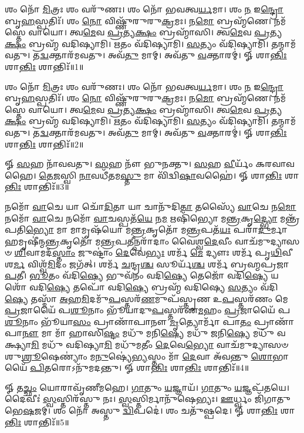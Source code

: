 


𑌶𑌂 𑌨𑍋᳴ \ul{𑌮𑌿}\-𑌤𑍍𑌰𑌃 𑌶𑌂 𑌵𑌰𑍁᳴𑌣𑌃। 
𑌶𑌂 𑌨𑍋᳴ 𑌭𑌵𑌤𑍍𑌵\-\ul{𑌰𑍍𑌯}\-𑌮𑌾। 
𑌶𑌂 \ul{𑌨} 𑌇\-\ul{𑌨𑍍𑌦𑍍𑌰𑍋} 𑌬𑍃\-\ul{𑌹}\-𑌸𑍍𑌪𑌤𑌿𑌃᳴। 
𑌶𑌂 \ul{𑌨𑍋} 𑌵𑌿𑌷𑍍𑌣𑍁᳴𑌰𑍁𑌰𑍁\-\ul{𑌕𑍍𑌰}\-𑌮𑌃। 
𑌨\-\ul{𑌮𑍋} 𑌬𑍍𑌰𑌹𑍍𑌮᳴𑌣𑍇। 
𑌨𑌮᳴𑌸𑍍𑌤𑍇 𑌵𑌾𑌯𑍋। 
𑌤𑍍𑌵\-\ul{𑌮𑍇}\-𑌵 \ul{𑌪𑍍𑌰}\-𑌤𑍍𑌯\-\ul{𑌕𑍍𑌷𑌂} 𑌬𑍍𑌰𑌹𑍍𑌮𑌾᳴𑌸𑌿। 
𑌤𑍍𑌵\-\ul{𑌮𑍇}\-𑌵 \ul{𑌪𑍍𑌰}\-𑌤𑍍𑌯\-\ul{𑌕𑍍𑌷𑌂} 𑌬𑍍𑌰𑌹𑍍𑌮᳴ 𑌵𑌦𑌿𑌷𑍍𑌯𑌾𑌮𑌿। 
\-\ul{𑌋}\-𑌤𑌂 𑌵᳴𑌦𑌿𑌷𑍍𑌯𑌾𑌮𑌿। 
\-\ul{𑌸}\-𑌤𑍍𑌯𑌂 𑌵᳴𑌦𑌿𑌷𑍍𑌯𑌾𑌮𑌿। 
𑌤𑌨𑍍𑌮𑌾𑌮᳴𑌵𑌤𑍁। 
𑌤\-\ul{𑌦𑍍𑌵}\-𑌕𑍍𑌤𑌾𑌰᳴𑌮𑌵𑌤𑍁। 
𑌅𑌵᳴\-\ul{𑌤𑍁} 𑌮𑌾𑌮𑍍। 
𑌅𑌵᳴𑌤𑍁 \ul{𑌵}\-𑌕𑍍𑌤𑌾𑌰𑌮𑍍॑। 
𑍐 𑌶𑌾\-\ul{𑌨𑍍𑌤𑌿𑌃} 𑌶𑌾\-\ul{𑌨𑍍𑌤𑌿𑌃} 𑌶𑌾𑌨𑍍𑌤𑌿𑌃᳴॥1॥

𑌶𑌂 𑌨𑍋᳴ \ul{𑌮𑌿}\-𑌤𑍍𑌰𑌃  𑌶𑌂 𑌵𑌰𑍁᳴𑌣𑌃। 𑌶𑌂 𑌨𑍋᳴ 𑌭𑌵𑌤𑍍𑌵\-\ul{𑌰𑍍𑌯}\-𑌮𑌾। 𑌶𑌂 \ul{𑌨} 𑌇\-\ul{𑌨𑍍𑌦𑍍𑌰𑍋} 𑌬𑍃\-\ul{𑌹}\-𑌸𑍍𑌪𑌤𑌿𑌃᳴। 𑌶𑌂 \ul{𑌨𑍋} 𑌵𑌿𑌷𑍍𑌣𑍁᳴𑌰𑍁𑌰𑍁\-\ul{𑌕𑍍𑌰}\-𑌮𑌃। 𑌨\-\ul{𑌮𑍋} 𑌬𑍍𑌰𑌹𑍍𑌮᳴𑌣𑍇। 𑌨𑌮᳴𑌸𑍍𑌤𑍇 𑌵𑌾𑌯𑍋। 𑌤𑍍𑌵\-\ul{𑌮𑍇}\-𑌵 \ul{𑌪𑍍𑌰}\-𑌤𑍍𑌯\-\ul{𑌕𑍍𑌷𑌂} 𑌬𑍍𑌰𑌹𑍍𑌮𑌾᳴𑌸𑌿। 𑌤𑍍𑌵\-\ul{𑌮𑍇}\-𑌵 \ul{𑌪𑍍𑌰}\-𑌤𑍍𑌯\-\ul{𑌕𑍍𑌷𑌂} 𑌬𑍍𑌰𑌹𑍍𑌮᳴ 𑌵𑌦𑌿𑌷𑍍𑌯𑌾𑌮𑌿। \ul{𑌋}\-𑌤𑌂 𑌵᳴𑌦𑌿𑌷𑍍𑌯𑌾𑌮𑌿। \ul{𑌸}\-𑌤𑍍𑌯𑌂 𑌵᳴𑌦𑌿𑌷𑍍𑌯𑌾𑌮𑌿। 𑌤𑌨𑍍𑌮𑌾𑌮᳴𑌵𑌤𑍁। 𑌤\-\ul{𑌦𑍍𑌵}\-𑌕𑍍𑌤𑌾𑌰᳴𑌮𑌵𑌤𑍁। 𑌅𑌵᳴\-\ul{𑌤𑍁} 𑌮𑌾𑌮𑍍। 𑌅𑌵᳴𑌤𑍁 \ul{𑌵}\-𑌕𑍍𑌤𑌾𑌰𑌮𑍍॑। 𑍐 𑌶𑌾\-\ul{𑌨𑍍𑌤𑌿𑌃} 𑌶𑌾\-\ul{𑌨𑍍𑌤𑌿𑌃} 𑌶𑌾𑌨𑍍𑌤𑌿𑌃᳴॥2॥

𑍐 \ul{𑌸}\-𑌹 𑌨𑌾᳴𑌵𑌵𑌤𑍁। \ul{𑌸}\-𑌹 𑌨𑍗᳴ 𑌭𑍁𑌨𑌕𑍍𑌤𑍁। \ul{𑌸}\-𑌹 \ul{𑌵𑍀}\-𑌰𑍍𑌯𑌂᳴ 𑌕𑌰𑌵𑌾𑌵𑌹𑍈। \ul{𑌤𑍇}\-\-\ul{𑌜}\-𑌸𑍍𑌵𑌿 \ul{𑌨𑌾}\-𑌵𑌧𑍀᳴𑌤𑌮\-\ul{𑌸𑍍𑌤𑍁} 𑌮𑌾 𑌵𑌿᳴𑌦𑍍𑌵𑌿\-\ul{𑌷𑌾}\-𑌵𑌹𑍈॑। 𑍐 𑌶𑌾\-\ul{𑌨𑍍𑌤𑌿𑌃} 𑌶𑌾\-\ul{𑌨𑍍𑌤𑌿𑌃} 𑌶𑌾𑌨𑍍𑌤𑌿𑌃᳴॥3॥

𑌨𑌮𑍋᳴ \ul{𑌵𑌾}\-𑌚𑍇 𑌯𑌾 𑌚𑍋᳴\-\ul{𑌦𑌿}\-𑌤𑌾 𑌯𑌾 𑌚𑌾𑌨𑍁᳴𑌦𑌿\-\ul{𑌤𑌾} 𑌤𑌸𑍍𑌯𑍈᳴ \ul{𑌵𑌾}\-𑌚𑍇 𑌨\-\ul{𑌮𑍋} 𑌨𑌮𑍋᳴ \ul{𑌵𑌾}\-𑌚𑍇 𑌨𑌮𑍋᳴ \ul{𑌵𑌾}\-𑌚𑌸𑍍𑌪𑌤᳴\-\ul{𑌯𑍇} 𑌨\-\ul{𑌮} 𑌋𑌷𑌿᳴𑌭𑍍𑌯𑍋 𑌮\-\ul{𑌨𑍍𑌤𑍍𑌰}\-𑌕𑍃\-\ul{𑌦𑍍𑌭𑍍𑌯𑍋} 𑌮𑌨𑍍𑌤𑍍𑌰᳴𑌪𑌤𑌿\-\ul{𑌭𑍍𑌯𑍋} 𑌮𑌾 𑌮𑌾𑌮𑍃𑌷᳴𑌯𑍋 𑌮\-\ul{𑌨𑍍𑌤𑍍𑌰}\-𑌕𑍃𑌤𑍋᳴ 𑌮\-\ul{𑌨𑍍𑌤𑍍𑌰}\-𑌪𑌤᳴\-\ul{𑌯𑌃} 𑌪𑌰𑌾᳴\-\ul{𑌦𑍁}\-𑌰𑍍𑌮𑌾𑌹𑌮𑍃𑌷𑍀॑𑌨𑍍𑌮\-\ul{𑌨𑍍𑌤𑍍𑌰}\-𑌕𑍃𑌤𑍋᳴ 𑌮\-\ul{𑌨𑍍𑌤𑍍𑌰}\-𑌪\-\ul{𑌤𑍀}\-𑌨𑍍𑌪𑌰𑌾᳴𑌦𑌾𑌂 𑌵𑍈𑌶𑍍𑌵\-\ul{𑌦𑍇}\-𑌵𑍀𑌂 𑌵𑌾𑌚᳴𑌮𑍁𑌦𑍍𑌯𑌾𑌸𑍞 \ul{𑌶𑌿}\-𑌵𑌾𑌮𑌦᳴\-\ul{𑌸𑍍𑌤𑌾𑌂} 𑌜𑍁𑌷𑍍𑌟𑌾𑌂॑ \ul{𑌦𑍇}\-𑌵𑍇\-\ul{𑌭𑍍𑌯𑌃} 𑌶𑌰𑍍𑌮᳴ \ul{𑌮𑍇} 𑌦𑍍𑌯𑍗𑌃  𑌶𑌰𑍍𑌮᳴ 𑌪𑍃\-\ul{𑌥𑌿}\-𑌵𑍀 𑌶\-\ul{𑌰𑍍𑌮} 𑌵𑌿𑌶𑍍𑌵᳴\-\ul{𑌮𑌿}\-𑌦𑌂 𑌜𑌗᳴𑌤𑍍। 𑌶𑌰𑍍𑌮᳴ \ul{𑌚}\-𑌨𑍍𑌦𑍍𑌰\-\ul{𑌶𑍍𑌚} 𑌸𑍂𑌰𑍍𑌯᳴\-\ul{𑌶𑍍𑌚} 𑌶𑌰𑍍𑌮᳴ 𑌬𑍍𑌰𑌹𑍍𑌮𑌪𑍍𑌰𑌜𑌾\-\ul{𑌪}\-𑌤𑍀। \ul{𑌭𑍂}\-𑌤𑌂 𑌵᳴𑌦𑌿\-\ul{𑌷𑍍𑌯𑍇} 𑌭𑍁𑌵᳴𑌨𑌂 𑌵𑌦𑌿\-\ul{𑌷𑍍𑌯𑍇} 𑌤𑍇𑌜𑍋᳴ 𑌵𑌦𑌿\-\ul{𑌷𑍍𑌯𑍇} 𑌯𑌶𑍋᳴ 𑌵𑌦𑌿\-\ul{𑌷𑍍𑌯𑍇} 𑌤𑌪𑍋᳴ 𑌵𑌦𑌿\-\ul{𑌷𑍍𑌯𑍇} 𑌬𑍍𑌰𑌹𑍍𑌮᳴ 𑌵𑌦𑌿𑌷𑍍𑌯𑍇 \ul{𑌸}\-𑌤𑍍𑌯𑌂 𑌵᳴𑌦𑌿\-\ul{𑌷𑍍𑌯𑍇} 𑌤𑌸𑍍𑌮𑌾᳴ \ul{𑌅}\-𑌹\-\ul{𑌮𑌿}\-𑌦𑌮𑍁᳴\-\ul{𑌪}\-𑌸𑍍𑌤𑌰᳴\-\ul{𑌣}\-𑌮𑍁𑌪᳴𑌸𑍍𑌤𑍃𑌣 𑌉\-\ul{𑌪}\-𑌸𑍍𑌤𑌰᳴𑌣𑌂 𑌮𑍇 \ul{𑌪𑍍𑌰}\-𑌜𑌾𑌯𑍈᳴ 𑌪\-\ul{𑌶𑍂}\-𑌨𑌾𑌂 𑌭𑍂᳴𑌯𑌾𑌦𑍁\-\ul{𑌪}\-𑌸𑍍𑌤𑌰᳴𑌣\-\ul{𑌮}\-𑌹𑌂 \ul{𑌪𑍍𑌰}\-𑌜𑌾𑌯𑍈᳴ 𑌪\-\ul{𑌶𑍂}\-𑌨𑌾𑌂 𑌭𑍂᳴𑌯𑌾\-\ul{𑌸𑌂} 𑌪𑍍𑌰𑌾𑌣𑌾᳴𑌪𑌾𑌨𑍗 \ul{𑌮𑍃}\-𑌤𑍍𑌯𑍋𑌰𑍍𑌮𑌾᳴ 𑌪𑌾\-\ul{𑌤𑌂} 𑌪𑍍𑌰𑌾𑌣𑌾᳴𑌪𑌾\-\ul{𑌨𑍗} 𑌮𑌾 𑌮𑌾᳴ 𑌹𑌾𑌸𑌿\-\ul{𑌷𑍍𑌟𑌂} 𑌮𑌧𑍁᳴ 𑌮𑌨𑌿\-\ul{𑌷𑍍𑌯𑍇} 𑌮𑌧𑍁᳴ 𑌜𑌨𑌿\-\ul{𑌷𑍍𑌯𑍇} 𑌮𑌧𑍁᳴ 𑌵𑌕𑍍𑌷𑍍𑌯𑌾\-\ul{𑌮𑌿} 𑌮𑌧𑍁᳴ 𑌵𑌦𑌿𑌷𑍍𑌯𑌾\-\ul{𑌮𑌿} 𑌮𑌧𑍁᳴𑌮𑌤𑍀𑌂 \ul{𑌦𑍇}\-𑌵𑍇\-\ul{𑌭𑍍𑌯𑍋} 𑌵𑌾𑌚᳴𑌮𑍁𑌦𑍍𑌯𑌾𑌸𑍞 𑌶𑍁\-\ul{𑌶𑍍𑌰𑍂}\-𑌷𑍇𑌣𑍍𑌯𑌾𑌂॑ 𑌮\-\ul{𑌨𑍁}\-𑌷𑍍𑌯𑍇॑\-\ul{𑌭𑍍𑌯}\-𑌸𑍍𑌤𑌂 𑌮𑌾᳴ \ul{𑌦𑍇}\-𑌵𑌾 𑌅᳴𑌵𑌨𑍍𑌤𑍁 \ul{𑌶𑍋}\-𑌭𑌾𑌯𑍈᳴ \ul{𑌪𑌿}\-𑌤𑌰𑍋𑌽𑌨𑍁᳴𑌮𑌦𑌨𑍍𑌤𑍁। 𑍐 𑌶𑌾\-\ul{𑌨𑍍𑌤𑌿𑌃} 𑌶𑌾\-\ul{𑌨𑍍𑌤𑌿𑌃} 𑌶𑌾𑌨𑍍𑌤𑌿𑌃᳴॥4॥

𑍐 𑌤\-\ul{𑌚𑍍𑌛𑌂} 𑌯𑍋𑌰𑌾𑌵𑍃᳴𑌣𑍀𑌮𑌹𑍇। \ul{𑌗𑌾}\-𑌤𑍁𑌂 \ul{𑌯}\-𑌜𑍍𑌞𑌾𑌯᳴। \ul{𑌗𑌾}\-𑌤𑍁𑌂 \ul{𑌯}\-𑌜𑍍𑌞𑌪᳴𑌤𑌯𑍇। 
𑌦𑍈𑌵𑍀𑌃॑ \ul{𑌸𑍍𑌵}\-𑌸𑍍𑌤𑌿𑌰᳴𑌸𑍍𑌤𑍁 𑌨𑌃। \ul{𑌸𑍍𑌵}\-𑌸𑍍𑌤𑌿𑌰𑍍𑌮𑌾𑌨𑍁᳴𑌷𑍇𑌭𑍍𑌯𑌃। \ul{𑌊}\-𑌰𑍍𑌧𑍍𑌵𑌂 𑌜𑌿᳴𑌗𑌾𑌤𑍁 𑌭𑍇\-\ul{𑌷}\-𑌜𑌮𑍍। 
𑌶𑌂 𑌨𑍋᳴ 𑌅𑌸𑍍𑌤𑍁 \ul{𑌦𑍍𑌵𑌿}\-𑌪𑌦𑍇॑। 𑌶𑌂 𑌚𑌤𑍁᳴𑌷𑍍𑌪𑌦𑍇। 𑍐 𑌶𑌾\-\ul{𑌨𑍍𑌤𑌿𑌃} 𑌶𑌾\-\ul{𑌨𑍍𑌤𑌿𑌃} 𑌶𑌾𑌨𑍍𑌤𑌿𑌃᳴॥5॥

